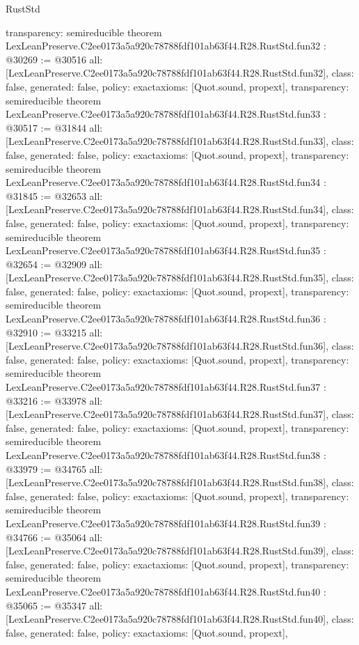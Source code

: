 \begin{lexlean}{RustStd}
\begin{coremodule}
{  transparency: semireducible
}
theorem LexLeanPreserve.C2ee0173a5a920c78788fdf101ab63f44.R28.RustStd.fun32 : @30269 := @30516 {
  all: [LexLeanPreserve.C2ee0173a5a920c78788fdf101ab63f44.R28.RustStd.fun32],
  class: false,
  generated: false,
  policy: exact{axioms: [Quot.sound, propext]},
  transparency: semireducible
}
theorem LexLeanPreserve.C2ee0173a5a920c78788fdf101ab63f44.R28.RustStd.fun33 : @30517 := @31844 {
  all: [LexLeanPreserve.C2ee0173a5a920c78788fdf101ab63f44.R28.RustStd.fun33],
  class: false,
  generated: false,
  policy: exact{axioms: [Quot.sound, propext]},
  transparency: semireducible
}
theorem LexLeanPreserve.C2ee0173a5a920c78788fdf101ab63f44.R28.RustStd.fun34 : @31845 := @32653 {
  all: [LexLeanPreserve.C2ee0173a5a920c78788fdf101ab63f44.R28.RustStd.fun34],
  class: false,
  generated: false,
  policy: exact{axioms: [Quot.sound, propext]},
  transparency: semireducible
}
theorem LexLeanPreserve.C2ee0173a5a920c78788fdf101ab63f44.R28.RustStd.fun35 : @32654 := @32909 {
  all: [LexLeanPreserve.C2ee0173a5a920c78788fdf101ab63f44.R28.RustStd.fun35],
  class: false,
  generated: false,
  policy: exact{axioms: [Quot.sound, propext]},
  transparency: semireducible
}
theorem LexLeanPreserve.C2ee0173a5a920c78788fdf101ab63f44.R28.RustStd.fun36 : @32910 := @33215 {
  all: [LexLeanPreserve.C2ee0173a5a920c78788fdf101ab63f44.R28.RustStd.fun36],
  class: false,
  generated: false,
  policy: exact{axioms: [Quot.sound, propext]},
  transparency: semireducible
}
theorem LexLeanPreserve.C2ee0173a5a920c78788fdf101ab63f44.R28.RustStd.fun37 : @33216 := @33978 {
  all: [LexLeanPreserve.C2ee0173a5a920c78788fdf101ab63f44.R28.RustStd.fun37],
  class: false,
  generated: false,
  policy: exact{axioms: [Quot.sound, propext]},
  transparency: semireducible
}
theorem LexLeanPreserve.C2ee0173a5a920c78788fdf101ab63f44.R28.RustStd.fun38 : @33979 := @34765 {
  all: [LexLeanPreserve.C2ee0173a5a920c78788fdf101ab63f44.R28.RustStd.fun38],
  class: false,
  generated: false,
  policy: exact{axioms: [Quot.sound, propext]},
  transparency: semireducible
}
theorem LexLeanPreserve.C2ee0173a5a920c78788fdf101ab63f44.R28.RustStd.fun39 : @34766 := @35064 {
  all: [LexLeanPreserve.C2ee0173a5a920c78788fdf101ab63f44.R28.RustStd.fun39],
  class: false,
  generated: false,
  policy: exact{axioms: [Quot.sound, propext]},
  transparency: semireducible
}
theorem LexLeanPreserve.C2ee0173a5a920c78788fdf101ab63f44.R28.RustStd.fun40 : @35065 := @35347 {
  all: [LexLeanPreserve.C2ee0173a5a920c78788fdf101ab63f44.R28.RustStd.fun40],
  class: false,
  generated: false,
  policy: exact{axioms: [Quot.sound, propext]},
}
\end{coremodule}
\end{lexlean}
